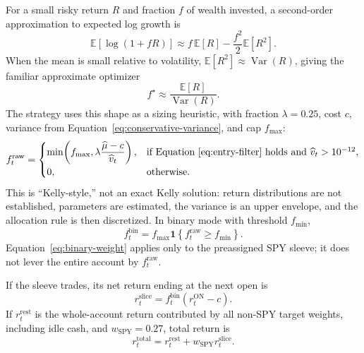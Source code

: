 \documentclass[11pt]{article}
\begin{document}
For a small risky return $R$ and fraction $f$ of wealth invested, a second-order approximation to
expected log growth is
\begin{equation}
 \mathbb E[\log(1+fR)]
 \approx f\,\mathbb E[R]-\frac{f^2}{2}\mathbb E[R^2].
 \label{eq:log-growth}
\end{equation}
When the mean is small relative to volatility,
$\mathbb E[R^2]\approx\operatorname{Var}(R)$, giving the familiar approximate optimizer
\begin{equation}
 f^{\star}\approx\frac{\mathbb E[R]}{\operatorname{Var}(R)}.
 \label{eq:kelly-approx}
\end{equation}
The strategy uses this shape as a sizing heuristic, with fraction $\lambda=0.25$, cost $c$, variance
from Equation~\eqref{eq:conservative-variance}, and cap $f_{\max}$:
\begin{equation}
 f_t^{\mathrm{raw}}=
 \begin{cases}
 \min\!\left(f_{\max},\lambda\dfrac{\widehat\mu-c}{\widehat v_t}\right),
 & \text{if Equation~\eqref{eq:entry-filter} holds and }\widehat v_t>10^{-12},\\[6pt]
 0,&\text{otherwise.}
 \end{cases}
 \label{eq:raw-weight}
\end{equation}
This is ``Kelly-style,'' not an exact Kelly solution: return distributions are not established,
parameters are estimated, the variance is an upper envelope, and the allocation rule is then
discretized. In binary mode with threshold $f_{\min}$,
\begin{equation}
 f_t^{\mathrm{bin}}=f_{\max}
 \mathbf 1\!\left\{f_t^{\mathrm{raw}}\geq f_{\min}\right\}.
 \label{eq:binary-weight}
\end{equation}
Equation~\eqref{eq:binary-weight} applies only to the preassigned SPY sleeve; it does not lever the
entire account by $f_t^{\mathrm{raw}}$.

If the sleeve trades, its net return ending at the next open is
\begin{equation}
 r_{t}^{\mathrm{slice}}
 =f_t^{\mathrm{bin}}\left(r_t^{\mathrm{ON}}-c\right).
 \label{eq:strategy-return}
\end{equation}
If $r_t^{\mathrm{rest}}$ is the whole-account return contributed by all non-SPY target weights,
including idle cash, and $w_{\mathrm{SPY}}=0.27$, total return is
\begin{equation}
 r_t^{\mathrm{total}}
 =r_t^{\mathrm{rest}}+w_{\mathrm{SPY}}r_t^{\mathrm{slice}}.
 \label{eq:combined-return}
\end{equation}
\end{document}
